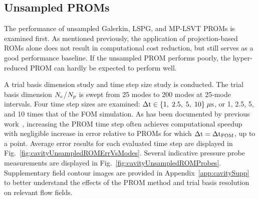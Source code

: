 \subsection{Unsampled PROMs}

The performance of unsampled Galerkin, LSPG, and MP-LSVT PROMs is examined first. As mentioned previously, the application of projection-based ROMs alone does not result in computational cost reduction, but still serves as a good performance baseline. If the unsampled PROM performs poorly, the hyper-reduced PROM can hardly be expected to perform well.

A trial basis dimension study and time step size study is conducted. The trial basis dimension $N_c$/$N_p$ is swept from 25 modes to 200 modes at 25-mode intervals. Four time step sizes are examined: $\Delta \text{t} \in \{ 1, \; 2.5, \; 5, \; 10 \} \; \mu \text{s}$, or 1, 2.5, 5, and 10 times that of the FOM simulation. As has been documented by previous work~\cite{Carlberg2017,Huang2022,Wentland2021}, increasing the PROM time step often achieves computational speedup with negligible increase in error relative to PROMs for which $\Delta \text{t} = \Delta \text{t}_{\text{FOM}}$, up to a point. Average error results for each evaluated time step are displayed in Fig.~\ref{fig:cavityUnsampledROMErrVsModes}. Several indicative pressure probe measurements are displayed in Fig.~\ref{fig:cavityUnsampledROMProbes}. Supplementary field contour images are provided in Appendix~\ref{app:cavitySupp} to better understand the effects of the PROM method and trial basis resolution on relevant flow fields.

